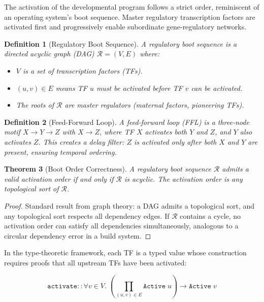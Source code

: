 \documentclass[12pt,a4paper]{article}
\newtheorem{theorem}{Theorem}[section]
\newtheorem{definition}[theorem]{Definition}
\begin{document}
The activation of the developmental program follows a strict order,
reminiscent of an operating system's boot sequence.  Master regulatory
transcription factors are activated first and progressively enable
subordinate gene-regulatory networks.

\begin{definition}[Regulatory Boot Sequence]\label{def:boot-seq}
A \emph{regulatory boot sequence} is a directed acyclic graph (DAG)
$\mathcal{R} = (V, E)$ where:
\begin{itemize}
  \item $V$ is a set of transcription factors (TFs).
  \item $(u, v) \in E$ means TF $u$ must be activated before TF $v$
    can be activated.
  \item The roots of $\mathcal{R}$ are \emph{master regulators}
    (maternal factors, pioneering TFs).
\end{itemize}
\end{definition}

\begin{definition}[Feed-Forward Loop]\label{def:ffl}
A \emph{feed-forward loop} (FFL) is a three-node motif
$X \to Y \to Z$ with $X \to Z$, where TF $X$ activates both
$Y$ and $Z$, and $Y$ also activates $Z$.  This creates a
\emph{delay filter}: $Z$ is activated only after both $X$ and $Y$
are present, ensuring temporal ordering.
\end{definition}

\begin{theorem}[Boot Order Correctness]\label{thm:boot-order}
A regulatory boot sequence $\mathcal{R}$ admits a valid activation
order if and only if $\mathcal{R}$ is acyclic.  The activation order
is any topological sort of $\mathcal{R}$.
\end{theorem}

\begin{proof}
Standard result from graph theory: a DAG admits a topological sort,
and any topological sort respects all dependency edges.  If
$\mathcal{R}$ contains a cycle, no activation order can satisfy all
dependencies simultaneously, analogous to a circular dependency
error in a build system.
\end{proof}

In the type-theoretic framework, each TF is a typed value whose
construction requires proofs that all upstream TFs have been
activated:

\[
  \texttt{activate} :: \forall v \in V.\;
  \left(\prod_{(u,v) \in E} \texttt{Active}\;u\right) \to
  \texttt{Active}\;v
\]
\end{document}

